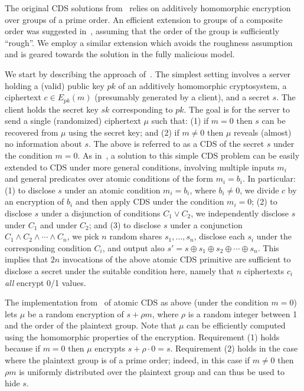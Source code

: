 \documentclass{article}
\begin{document}
The original CDS solutions from~\cite{AIR01}  relies on additively homomorphic
encryption over groups of a prime order. An efficient extension to
groups of a composite order was suggested in~\cite{L05}, assuming
that the order of the group is sufficiently ``rough''. We employ a
similar extension which avoids the roughness assumption and is
geared towards the solution in the fully malicious model.

We start by describing the approach of~\cite{AIR01}. The simplest
setting involves a server holding a (valid) public key $pk$ of an additively
homomorphic cryptosystem, a ciphertext $c\in E_{pk}(m)$ (presumably
generated by a client), and a secret $s$. The client holds the
secret key $sk$ corresponding to $pk$. The goal is for the server
to send a single (randomized) ciphertext $\mu$ such that: (1) if
$m=0$ then $s$ can be recovered from $\mu$ using the secret key;
and (2) if $m\neq 0$ then $\mu$ reveals (almost) no information
about $s$. The above is referred to as a CDS of the secret $s$
under the condition $m=0$. As in~\cite{GIKM,AIR01}, a solution to
this simple CDS problem can be easily extended to CDS under more
general conditions, involving multiple inputs $m_i$ and general
predicates over atomic conditions of the form $m_i=b_i$. In
particular: (1) to disclose $s$ under an atomic condition
$m_i=b_i$, where $b_i\neq 0$, we divide $c$ by an encryption of
$b_i$ and then apply CDS under the condition $m_i=0$; (2) to
disclose $s$ under a disjunction of conditions $C_1\vee C_2$, we
independently disclose $s$ under $C_1$ and under $C_2$; and (3) to
disclose $s$ under a conjunction $C_1\wedge C_2\wedge \cdots \wedge
C_n$, we pick $n$ random shares $s_1,\ldots,s_n$, disclose each $s_i$ under the corresponding condition $C_i$,
and output also $s'=s\oplus s_1\oplus s_2\oplus\cdots\oplus s_n$. This implies that
$2n$ invocations of the above atomic CDS primitive are sufficient
to disclose a secret under the suitable condition here, namely that
$n$ ciphertexts $c_i$ {\em all} encrypt 0/1 values.

The implementation from~\cite{AIR01} of atomic CDS as above (under
the condition $m=0$) lets $\mu$ be a random encryption of $s+\rho
m$, where $\rho$ is a random integer between 1 and the order of the
plaintext group. Note that $\mu$ can be efficiently computed using
the homomorphic properties of the encryption. Requirement (1) holds
because if $m=0$ then $\mu$ encrypts $s+\rho\cdot 0=s$. Requirement
(2) holds in the case where the plaintext group is of a prime
order; indeed, in this case if $m\neq 0$ then $\rho m$ is uniformly
distributed over the plaintext group and can thus be used to hide
$s$.
\end{document}
